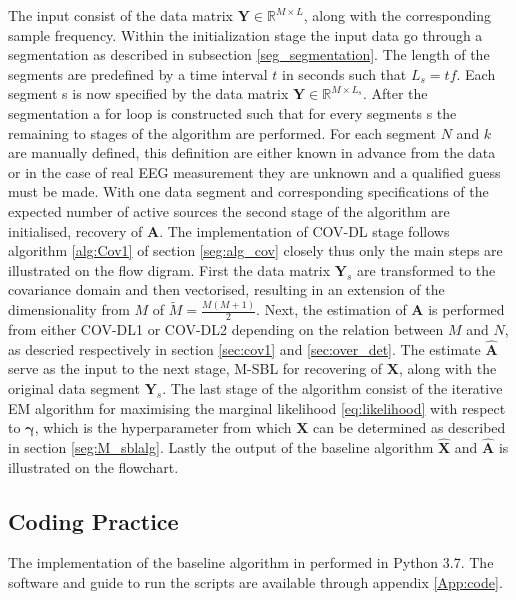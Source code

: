 The input consist of the data matrix $\textbf{Y}\in \mathbb{R}^{M\times L}$, along with the corresponding sample frequency. 
Within the initialization stage the input data go through a segmentation as described in subsection \ref{seg_segmentation}. The length of the segments are predefined by a time interval $t$ in seconds such that $L_{s} = tf$. 
Each segment s is now specified by the data matrix $\textbf{Y}\in \mathbb{R}^{M \times L_{s}}$.
After the segmentation a for loop is constructed such that for every segments s the remaining to stages of the algorithm are performed. 
For each segment $N$ and $k$ are manually defined, this definition are either known in advance from the data or in the case of real EEG measurement they are unknown and a qualified guess must be made.
With one data segment and corresponding specifications of the expected number of active sources the second stage of the algorithm are initialised, recovery of $\textbf{A}$.
The implementation of COV-DL stage follows algorithm \ref{alg:Cov1} of section \ref{seg:alg_cov} closely thus only the main steps are illustrated on the flow digram.
First the data matrix $\textbf{Y}_s$ are transformed to the covariance domain and then vectorised, resulting in an extension of the dimensionality from $M$ of $\widetilde{M}=\frac{M(M+1)}{2}$.
Next, the estimation of $\textbf{A}$ is performed from either COV-DL1 or COV-DL2 depending on the relation between $M$ and $N$, as descried respectively in section \ref{sec:cov1} and \ref{sec:over_det}.
The estimate $\hat{\textbf{A}}$ serve as the input to the next stage, M-SBL for recovering of $\textbf{X}$, along with the original data segment $\textbf{Y}_s$. The last stage of the algorithm consist of the iterative EM algorithm for maximising the marginal likelihood \eqref{eq:likelihood} with respect to $\boldsymbol{\gamma}$, which is the hyperparameter from which $\textbf{X}$ can be determined as described in section \ref{seg:M_sblalg}. Lastly the output of the baseline algorithm $\hat{\textbf{X}}$ and $\hat{\textbf{A}}$ is illustrated on the flowchart.

\subsection{Coding Practice}
The implementation of the baseline algorithm in performed in Python 3.7. The software and guide to run the scripts are available through appendix \ref{App:code}.

